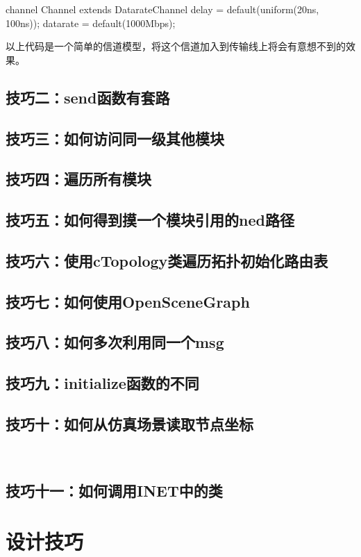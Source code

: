 \begin{lstseting}
	channel Channel extends DatarateChannel
	{
		delay = default(uniform(20ns, 100ns));
		datarate = default(1000Mbps);
	}
\end{lstseting}

以上代码是一个简单的信道模型，将这个信道加入到传输线上将会有意想不到的效果。

\subsection{技巧二：send函数有套路}
\subsection{技巧三：如何访问同一级其他模块}
\subsection{技巧四：遍历所有模块}
\subsection{技巧五：如何得到摸一个模块引用的ned路径}

\subsection{技巧六：使用cTopology类遍历拓扑初始化路由表}

\subsection{技巧七：如何使用OpenSceneGraph}
\subsection{技巧八：如何多次利用同一个msg}

\subsection{技巧九：initialize函数的不同}
\subsection{技巧十：如何从仿真场景读取节点坐标}\\
\subsection{技巧十一：如何调用INET中的类}




\section{设计技巧}






